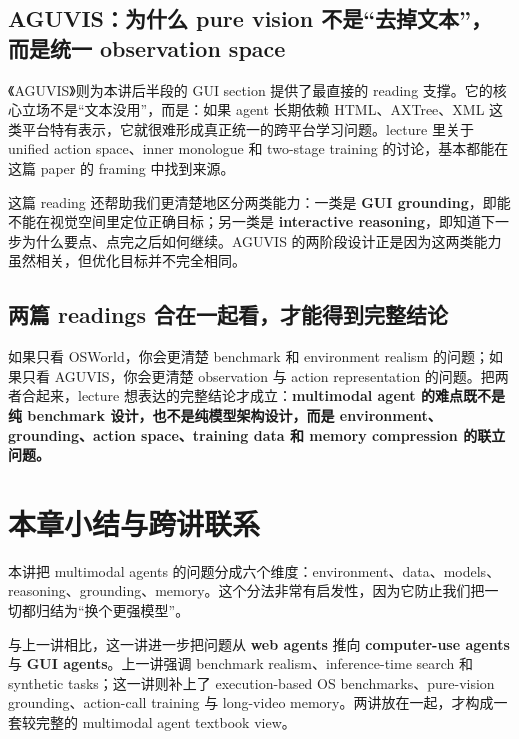 \documentclass[a4paper]{article}
\begin{document}
\subsection{AGUVIS：为什么 pure vision 不是“去掉文本”，而是统一 observation space}

《AGUVIS》则为本讲后半段的 GUI section 提供了最直接的 reading 支撑。它的核心立场不是“文本没用”，而是：如果 agent 长期依赖 HTML、AXTree、XML 这类平台特有表示，它就很难形成真正统一的跨平台学习问题。lecture 里关于 unified action space、inner monologue 和 two-stage training 的讨论，基本都能在这篇 paper 的 framing 中找到来源。

这篇 reading 还帮助我们更清楚地区分两类能力：一类是 \textbf{GUI grounding}，即能不能在视觉空间里定位正确目标；另一类是 \textbf{interactive reasoning}，即知道下一步为什么要点、点完之后如何继续。AGUVIS 的两阶段设计正是因为这两类能力虽然相关，但优化目标并不完全相同。

\subsection{两篇 readings 合在一起看，才能得到完整结论}

如果只看 OSWorld，你会更清楚 benchmark 和 environment realism 的问题；如果只看 AGUVIS，你会更清楚 observation 与 action representation 的问题。把两者合起来，lecture 想表达的完整结论才成立：\textbf{multimodal agent 的难点既不是纯 benchmark 设计，也不是纯模型架构设计，而是 environment、grounding、action space、training data 和 memory compression 的联立问题。}

\section{本章小结与跨讲联系}

本讲把 multimodal agents 的问题分成六个维度：environment、data、models、reasoning、grounding、memory。这个分法非常有启发性，因为它防止我们把一切都归结为“换个更强模型”。

与上一讲相比，这一讲进一步把问题从 \textbf{web agents} 推向 \textbf{computer-use agents} 与 \textbf{GUI agents}。上一讲强调 benchmark realism、inference-time search 和 synthetic tasks；这一讲则补上了 execution-based OS benchmarks、pure-vision grounding、action-call training 与 long-video memory。两讲放在一起，才构成一套较完整的 multimodal agent textbook view。
\end{document}
